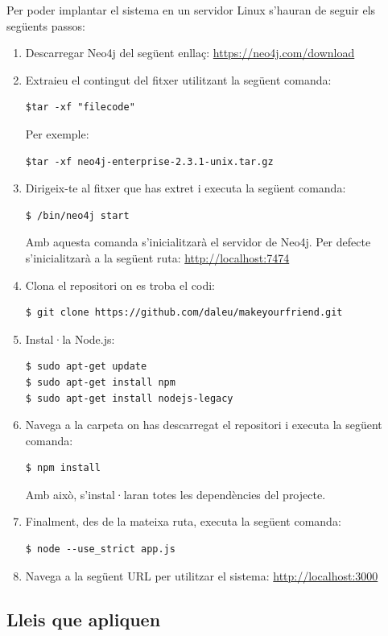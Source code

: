 \documentclass[11pt,catalan,listoffigures,listoftables]{tfgetsinf}
\begin{document}
Per poder implantar el sistema en un servidor Linux s'hauran de seguir els següents passos:
\begin{enumerate}
\item Descarregar Neo4j del següent enllaç: \url{https://neo4j.com/download}
\item Extraieu el contingut del fitxer utilitzant la següent comanda:
\begin{lstlisting}
$tar -xf "filecode"
\end{lstlisting}
Per exemple:
\begin{lstlisting}
$tar -xf neo4j-enterprise-2.3.1-unix.tar.gz
\end{lstlisting}
\item Dirigeix-te al fitxer que has extret i executa la següent comanda:
\begin{lstlisting}
$ /bin/neo4j start
\end{lstlisting}
Amb aquesta comanda s'inicialitzarà el servidor de Neo4j. Per defecte s'inicialitzarà a la següent ruta: \url{http://localhost:7474}
\item Clona el repositori on es troba el codi:
\begin{lstlisting}
$ git clone https://github.com/daleu/makeyourfriend.git
\end{lstlisting}
\item Instal·la Node.js:
\begin{lstlisting}
$ sudo apt-get update
$ sudo apt-get install npm
$ sudo apt-get install nodejs-legacy
\end{lstlisting}
\item Navega a la carpeta on has descarregat el repositori i executa la següent comanda:
\begin{lstlisting}
$ npm install
\end{lstlisting}
Amb això, s'instal·laran totes les dependències del projecte.
\item Finalment, des de la mateixa ruta, executa la següent comanda:
\begin{lstlisting}
$ node --use_strict app.js
\end{lstlisting}
\item Navega a la següent URL per utilitzar el sistema: \url{http://localhost:3000}
\end{enumerate}

\subsection{Lleis que apliquen}
\end{document}
